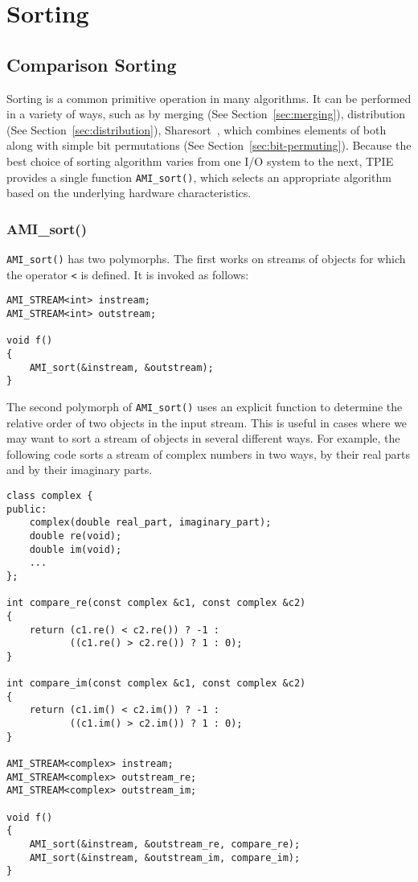 \section{Sorting}

\subsection{Comparison Sorting} \label{sec:cmp-sorting}

Sorting is a common primitive operation in many algorithms.  It can be
performed in a variety of ways, such as by merging (See
Section~\ref{sec:merging}), distribution (See
Section~\ref{sec:distribution}), Sharesort~\cite{aggarwal:optimal},
which combines elements of both along with simple bit permutations
(See Section~\ref{sec:bit-permuting}).  Because the best choice of
sorting algorithm varies from one I/O system to the next, TPIE
provides a single function \verb|AMI_sort()|, which selects an
appropriate algorithm based on the underlying hardware
characteristics.

\subsubsection{AMI\_sort()}
\verb|AMI_sort()| has two polymorphs.  The first works on streams of
objects for which the operator \verb|<| is defined.  It is invoked as
follows:

\begin{verbatim}
AMI_STREAM<int> instream;
AMI_STREAM<int> outstream;

void f()
{
    AMI_sort(&instream, &outstream);
}
\end{verbatim}

The second polymorph of \verb|AMI_sort()| uses an explicit function to
determine the relative order of two objects in the input stream.  This
is useful in cases where we may want to sort a stream of objects in
several different ways.  For example, the following code sorts a
stream of complex numbers in two ways, by their real parts and by
their imaginary parts.

\begin{verbatim}
class complex {
public:
    complex(double real_part, imaginary_part);
    double re(void);
    double im(void);
    ...
};

int compare_re(const complex &c1, const complex &c2)
{
    return (c1.re() < c2.re()) ? -1 :
           ((c1.re() > c2.re()) ? 1 : 0);
}

int compare_im(const complex &c1, const complex &c2)
{
    return (c1.im() < c2.im()) ? -1 :
           ((c1.im() > c2.im()) ? 1 : 0);
}

AMI_STREAM<complex> instream;
AMI_STREAM<complex> outstream_re;
AMI_STREAM<complex> outstream_im;

void f()
{
    AMI_sort(&instream, &outstream_re, compare_re);
    AMI_sort(&instream, &outstream_im, compare_im);
}
\end{verbatim}


